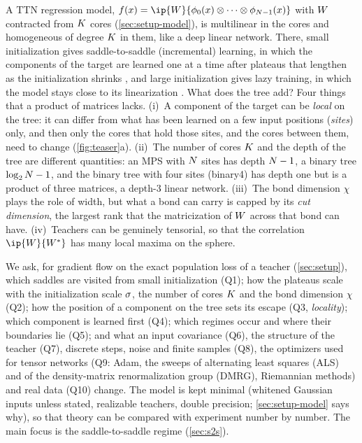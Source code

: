 A TTN regression model, $f(x)=\ip{\W}{\feat{0}(x)\otimes\dots\otimes\feat{\Ns-1}(x)}$ with
$W$ contracted from $K$ cores (\cref{sec:setup-model}), is multilinear in the cores and homogeneous
of degree $K$ in them, like a deep linear network. There, small initialization gives saddle-to-saddle
(incremental) learning, in which the components of the target are learned one at a time after plateaus
that lengthen as the initialization shrinks \citep{saxe2014exact,jacot2022saddletosaddle}, and large
initialization gives lazy training, in which the model stays close to its linearization
\citep{jacot2018neural,chizat2019lazy}. What does the tree add? Four things that a product of matrices
lacks. (i)~A component of the target can be \emph{local} on the tree: it can differ from what has been
learned on a few input positions (\emph{sites}) only, and then only the cores that hold those sites, and
the cores between them, need to change (\cref{fig:teaser}a). (ii)~The number of cores $K$ and the
depth of the tree are different quantities: an MPS with $N$ sites has depth $N-1$, a binary tree
$\log_2N-1$, and the binary tree with four sites (binary4) has depth one but is a product of three
matrices, a depth-3 linear network. (iii)~The bond dimension $\chi$ plays the role of width, but what a
bond can carry is capped by its \emph{cut dimension}, the largest rank that the matricization of $W$
across that bond can have. (iv)~Teachers can be genuinely tensorial, so that the correlation
$\ip{\W}{\Wt}$ has many local maxima on the sphere.

We ask, for gradient flow on the exact population loss of a teacher (\cref{sec:setup}), which saddles
are visited from small initialization (Q1); how the plateaus scale with the initialization scale $\sigma$,
the number of cores $K$ and the bond dimension $\chi$ (Q2); how the position of a component on the
tree sets its escape (Q3, \emph{locality}); which component is learned first (Q4); which regimes occur
and where their boundaries lie (Q5); and what an input covariance (Q6), the structure of the teacher
(Q7), discrete steps, noise and finite samples (Q8), the optimizers used for tensor networks (Q9: Adam,
the sweeps of alternating least squares (ALS) and of the density-matrix renormalization group (DMRG),
Riemannian methods) and real data (Q10) change. The model is kept minimal (whitened Gaussian inputs
unless stated, realizable teachers, double precision; \cref{sec:setup-model} says why), so that theory
can be compared with experiment number by number. The main focus is the saddle-to-saddle regime
(\cref{sec:s2s}).

